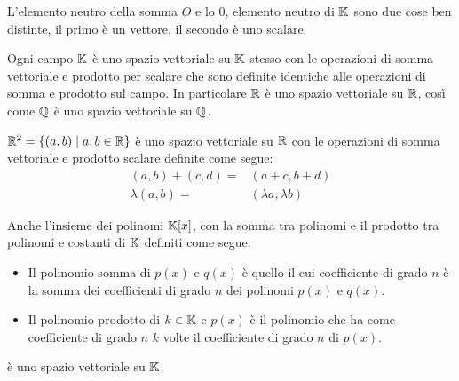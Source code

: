 \begin{observation}
	L'elemento neutro della somma $O$ e lo $0$, elemento neutro di $\mathbb{K}$ sono due cose ben distinte, il primo è
	un vettore, il secondo è uno scalare.
\end{observation}

\begin{example}
	Ogni campo $\mathbb{K}$ è uno spazio vettoriale su $\mathbb{K}$ stesso con le operazioni di somma vettoriale e prodotto per
	scalare che sono definite identiche alle operazioni di somma e prodotto sul campo. In particolare $\mathbb{R}$ è uno
	spazio vettoriale su $\mathbb{R}$, così come $\mathbb{Q}$ è uno spazio vettoriale su $\mathbb{Q}$.
\end{example}

\begin{example}
	$\mathbb{R}^2 = \{(a, b) \mid a,b \in \mathbb{R}\}$ è uno spazio vettoriale su $\mathbb{R}$ con le operazioni di somma vettoriale e
	prodotto scalare definite come segue:
	\begin{align*}
		(a,b) + (c,d) =  & (a + c, b + d)         \\
		\lambda (a, b) = & (\lambda a, \lambda b)
	\end{align*}
\end{example}

\begin{example}
	Anche l'insieme dei polinomi $\mathbb{K}[x]$, con la somma tra polinomi e il prodotto tra polinomi e costanti di
	$\mathbb{K}$ definiti come segue:
	\begin{itemize}
		\item Il polinomio somma di $p(x)$ e $q(x)$ è quello il cui coefficiente di grado $n$ è la somma dei
		      coefficienti di grado $n$ dei polinomi $p(x)$ e $q(x)$.
		\item Il polinomio prodotto di $k \in \mathbb{K}$ e $p(x)$ è il polinomio che ha come coefficiente di
		      grado $n$ $k$ volte il coefficiente di grado $n$ di $p(x)$.
	\end{itemize}
	è uno spazio vettoriale su $\mathbb{K}$.
\end{example}
